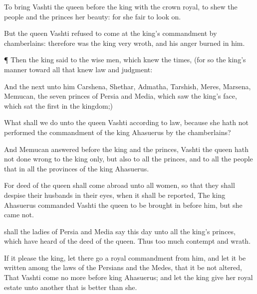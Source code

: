 {To
bring
Vashti the
queen
before the
king with the
crown
royal, to
shew the
people and the
princes her
beauty: for she
{}
fair to look
on.

But the
queen
Vashti
refused to
come at the
king’s
commandment
by
{}
chamberlains: therefore was the
king
very
wroth, and his
anger
burned in him.


\par }{\PP {}¶ Then the
king
said to the wise
men, which
knew the
times, (for so
{} the
king’s
manner
toward all that
knew
law and
judgment:

And the
next unto him
{}
Carshena,
Shethar,
Admatha,
Tarshish,
Meres,
Marsena,
{}
Memucan, the
seven
princes of
Persia and
Media, which
saw the
king’s
face,
{} which
sat the
first in the
kingdom;)

What shall we
do unto the
queen
Vashti according to
law, because she hath not
performed the
commandment of the
king
Ahasuerus
by the
chamberlains?

And
Memucan
answered
before the
king and the
princes,
Vashti the
queen hath not done
wrong to the
king only, but also to all the
princes, and to all the
people that
{} in all the
provinces of the
king
Ahasuerus.

For
{}
deed of the
queen shall come
abroad unto all
women, so that they shall
despise their
husbands in their
eyes, when it shall be
reported, The
king
Ahasuerus
commanded
Vashti the
queen to be brought
in
before him, but she
came not.

 shall the
ladies of
Persia and
Media
say this
day unto all the
king’s
princes, which have
heard of the
deed of the
queen. Thus
{} too
much
contempt and
wrath.

If it
please the
king, let there
go a
royal
commandment from
him, and let it be
written among the
laws of the
Persians and the
Medes, that it be not
altered, That
Vashti
come no more
before
king
Ahasuerus; and let the
king
give her royal
estate unto
another that is
better than she.

}
